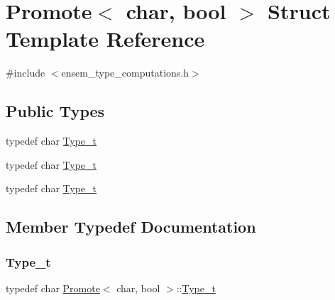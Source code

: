 \hypertarget{structPromote_3_01char_00_01bool_01_4}{}\section{Promote$<$ char, bool $>$ Struct Template Reference}
\label{structPromote_3_01char_00_01bool_01_4}


{\ttfamily \#include $<$ensem\+\_\+type\+\_\+computations.\+h$>$}

\subsection*{Public Types}
\begin{DoxyCompactItemize}
\item 
typedef char \mbox{\hyperlink{structPromote_3_01char_00_01bool_01_4_a8b53bc79ca8fc3ead19479e121877c8f}{Type\+\_\+t}}
\item 
typedef char \mbox{\hyperlink{structPromote_3_01char_00_01bool_01_4_a8b53bc79ca8fc3ead19479e121877c8f}{Type\+\_\+t}}
\item 
typedef char \mbox{\hyperlink{structPromote_3_01char_00_01bool_01_4_a8b53bc79ca8fc3ead19479e121877c8f}{Type\+\_\+t}}
\end{DoxyCompactItemize}


\subsection{Member Typedef Documentation}
\mbox{\label{structPromote_3_01char_00_01bool_01_4_a8b53bc79ca8fc3ead19479e121877c8f}} 
\subsubsection{\texorpdfstring{Type\_t}{Type\_t}\hspace{0.1cm}{\footnotesize\ttfamily [1/3]}}
{\footnotesize\ttfamily typedef char \mbox{\hyperlink{structPromote}{Promote}}$<$ char, bool $>$\+::\mbox{\hyperlink{structPromote_3_01char_00_01bool_01_4_a8b53bc79ca8fc3ead19479e121877c8f}{Type\+\_\+t}}}

\mbox{\label{structPromote_3_01char_00_01bool_01_4_a8b53bc79ca8fc3ead19479e121877c8f}} 
